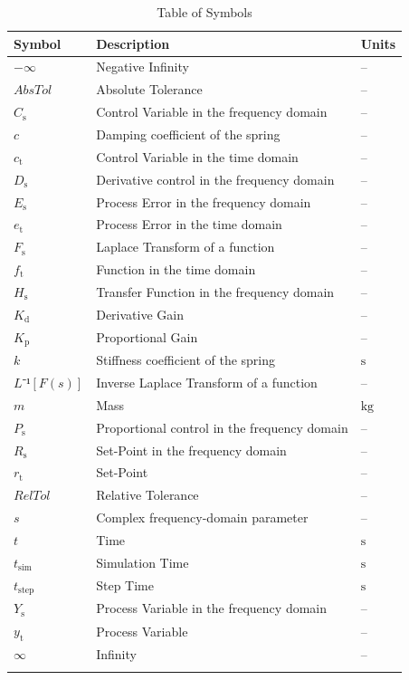 \documentclass[12pt]{article}
\begin{document}
\begin{longtable}{l l l}
\toprule
\textbf{Symbol} & \textbf{Description} & \textbf{Units}
\\
\midrule
\endhead
$-∞$ & Negative Infinity & --
\\
$AbsTol$ & Absolute Tolerance & --
\\
${C_{\text{s}}}$ & Control Variable in the frequency domain & --
\\
$c$ & Damping coefficient of the spring & --
\\
${c_{\text{t}}}$ & Control Variable in the time domain & --
\\
${D_{\text{s}}}$ & Derivative control in the frequency domain & --
\\
${E_{\text{s}}}$ & Process Error in the frequency domain & --
\\
${e_{\text{t}}}$ & Process Error in the time domain & --
\\
${F_{\text{s}}}$ & Laplace Transform of a function & --
\\
${f_{\text{t}}}$ & Function in the time domain & --
\\
${H_{\text{s}}}$ & Transfer Function in the frequency domain & --
\\
${K_{\text{d}}}$ & Derivative Gain & --
\\
${K_{\text{p}}}$ & Proportional Gain & --
\\
$k$ & Stiffness coefficient of the spring & ${\text{s}}$
\\
$L⁻¹[F(s)]$ & Inverse Laplace Transform of a function & --
\\
$m$ & Mass & ${\text{kg}}$
\\
${P_{\text{s}}}$ & Proportional control in the frequency domain & --
\\
${R_{\text{s}}}$ & Set-Point in the frequency domain & --
\\
${r_{\text{t}}}$ & Set-Point & --
\\
$RelTol$ & Relative Tolerance & --
\\
$s$ & Complex frequency-domain parameter & --
\\
$t$ & Time & ${\text{s}}$
\\
${t_{\text{sim}}}$ & Simulation Time & ${\text{s}}$
\\
${t_{\text{step}}}$ & Step Time & ${\text{s}}$
\\
${Y_{\text{s}}}$ & Process Variable in the frequency domain & --
\\
${y_{\text{t}}}$ & Process Variable & --
\\
$∞$ & Infinity & --
\\
\bottomrule
\caption{Table of Symbols}
\label{Table:ToS}
\end{longtable}
\end{document}
